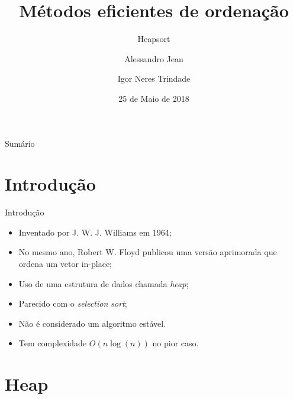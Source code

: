 \documentclass[t, 10pt]{beamer}
\title{Métodos eficientes de ordenação}
\subtitle{Heapsort}
\author{Alessandro Jean \\ \and Igor Neres Trindade}
\institute{Universidade Federal do ABC}
\date{25 de Maio de 2018}
\begin{document}
  
  \begin{frame}{Sumário}
    \tableofcontents
  \end{frame}
  
  \section{Introdução}
  
  \begin{frame}{Introdução}
    \begin{itemize}
      \item Inventado por J\@. W\@. J\@. Williams em 1964;
      \item No mesmo ano, Robert W\@. Floyd publicou uma versão aprimorada que ordena
      um vetor in-place;
   	  \item Uso de uma estrutura de dados chamada \emph{heap};
   	  \item Parecido com o \emph{selection sort};
   	  \item Não é considerado um algoritmo estável.
   	  \item Tem complexidade $O(n\log(n))$ no pior caso.
   	  
    \end{itemize}
  \end{frame}

  \section{Heap}
  
\end{document}
